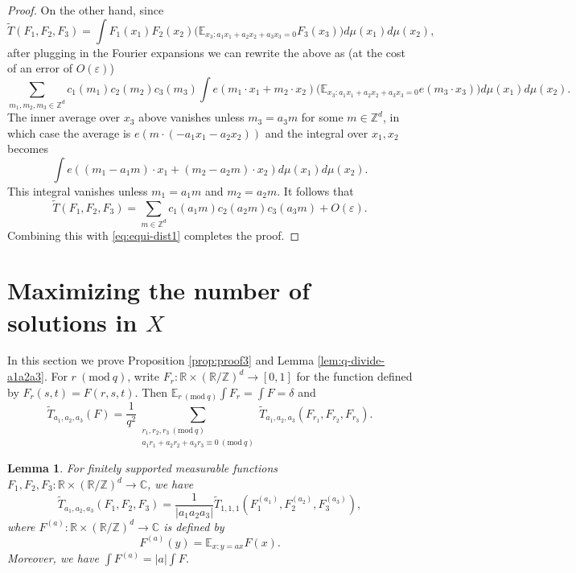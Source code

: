 \documentclass[12pt, notitlepage]{amsart}
\numberwithin{equation}{section}
\def\R{\mathbb R}
\def\Z{\mathbb Z}
\def\C{\mathbb C}
\def\E{\mathbb E}
\def\wt{\widetilde}
\newcommand{\eps}{\varepsilon}
\newcommand{\Mod}[1]{\ (\mathrm{mod}\ #1)}
\newtheorem{lemma}[theorem]{Lemma}
\theoremstyle{remark}
\theoremstyle{definition}
\theoremstyle{remark}
\numberwithin{equation}{section}
\begin{document}
\begin{proof}
On the other hand, since
$$
\wt{T}(F_1,F_2,F_3) = \int F_1(x_1) F_2(x_2) \Big(\E_{x_3:a_1x_1+a_2x_2+a_3x_3=0} F_3(x_3)\Big) d\mu(x_1) d\mu(x_2),
$$
after plugging in the Fourier expansions we can rewrite the above as (at the cost of an error of $O(\eps)$)
$$
\sum_{m_1,m_2,m_3 \in \Z^d} c_1(m_1)c_2(m_2)c_3(m_3) \int e(m_1\cdot x_1+m_2\cdot x_2) \Big(\E_{x_3:a_1x_1+a_2x_2+a_3x_3=0} e(m_3\cdot x_3)\Big) d\mu(x_1) d\mu(x_2).
$$
The inner average over $x_3$ above vanishes unless $m_3 = a_3m$ for some $m \in \Z^d$, in which case the average is $e(m\cdot (-a_1x_1-a_2x_2))$ and the integral over $x_1,x_2$ becomes 
$$
\int e((m_1-a_1m)\cdot x_1+(m_2-a_2m)\cdot x_2) d\mu(x_1) d\mu(x_2).
$$
This integral vanishes unless $m_1=a_1m$ and $m_2 = a_2m$. It follows that
$$
\wt{T}(F_1,F_2,F_3) = \sum_{m \in \Z^d} c_1(a_1m)c_2(a_2m)c_3(a_3m) + O(\eps).
$$
Combining this with \eqref{eq:equi-dist1} completes the proof.
\end{proof}

\section{Maximizing the number of solutions in $X$}\label{sec:proof3}

In this section we prove Proposition \ref{prop:proof3} and Lemma \ref{lem:q-divide-a1a2a3}.  For $r\Mod{q}$, write $F_r: \R \times (\R/\Z)^d \rightarrow [0,1]$ for the function defined by $F_r(s,t) = F(r,s,t)$. Then $\E_{r\Mod{q}} \int F_r = \int F = \delta$ and 
$$
\wt{T}_{a_1,a_2,a_3}(F) = \frac{1}{q^2}\sum_{\substack{r_1,r_2,r_3\Mod{q} \\ a_1r_1+a_2r_2+a_3r_3\equiv 0\Mod{q}}} \wt{T}_{a_1,a_2,a_3}(F_{r_1},F_{r_2}, F_{r_3}).
$$

\begin{lemma}\label{lem:TF-TFa}
For finitely supported measurable functions $F_1, F_2, F_3: \R \times (\R/\Z)^d \rightarrow \C$, we have
$$
\wt{T}_{a_1,a_2,a_3}(F_1,F_2,F_3) = \frac{1}{|a_1a_2a_3|}\wt{T}_{1,1,1}(F_1^{(a_1)}, F_2^{(a_2)}, F_3^{(a_3)}),
$$ 
where $F^{(a)}: \R \times (\R/\Z)^d \rightarrow \C$ is defined by
$$
F^{(a)}(y) = \E_{x: y=ax} F(x).
$$
Moreover, we have $\int F^{(a)} = |a|\int F$.
\end{lemma}
\end{document}
